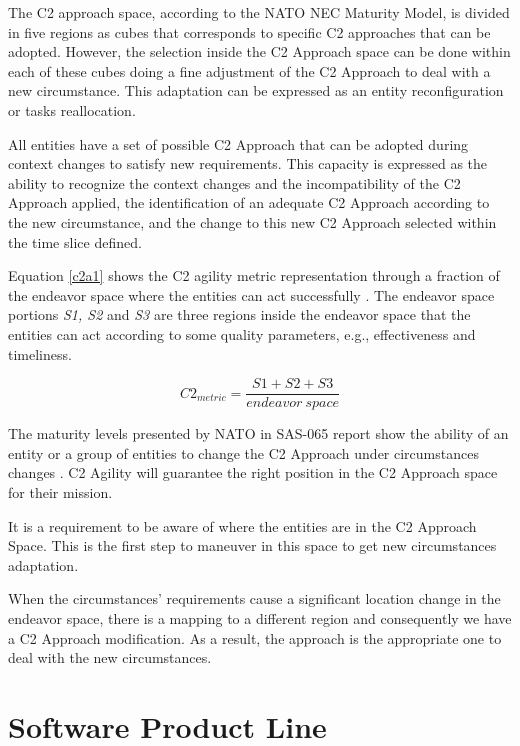 The C2 approach space, according to the NATO NEC Maturity Model, is divided in five regions as cubes that corresponds to specific C2 approaches that can be adopted. However, the selection inside the C2 Approach space can be done within each of these cubes doing a fine adjustment of the C2 Approach to deal with a new circumstance. This adaptation can be expressed as an entity reconfiguration or tasks reallocation.

All entities have a set of possible C2 Approach that can be adopted during context changes to satisfy new requirements. This capacity is expressed as the ability to recognize the context changes and the incompatibility of the C2 Approach applied, the identification of an adequate C2 Approach according to the new circumstance, and the change to this new C2 Approach selected within the time slice defined.

Equation \eqref{c2a1} shows the C2 agility metric representation through a fraction of the endeavor space where the entities can act successfully \cite{Alberts2017}. The endeavor space portions \textit{S1, S2} and \textit{S3} are three regions inside the endeavor space that the entities can act according to some quality parameters, e.g., effectiveness and timeliness. 

\begin{equation}
\label{c2a1}
 C2_{metric} = \frac{S1 + S2 + S3}{endeavor\ space}  
\end{equation}

The maturity levels presented by NATO in SAS-065 report show the ability of an entity or a group of entities to change the C2 Approach under circumstances changes \cite{nato01}. C2 Agility will guarantee the right position in the C2 Approach space for their mission.

It is a requirement to be aware of where the entities are in the C2 Approach Space. This is the first step to maneuver in this space to get new circumstances adaptation.

When the circumstances' requirements cause a significant location change in the endeavor space, there is a mapping to a different region and consequently we have a C2 Approach modification. As a result, the approach is the appropriate one to deal with the new circumstances.


\section {Software Product Line}

